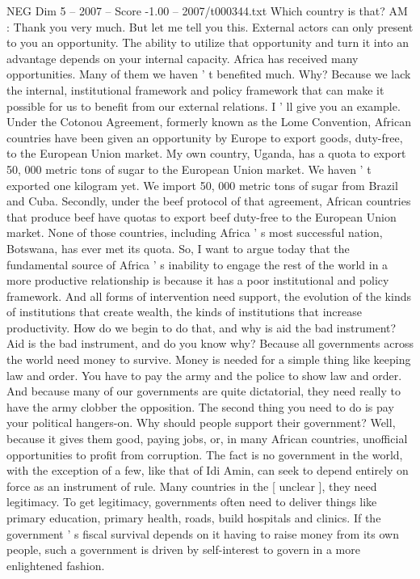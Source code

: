 \begin{textsample}{NEG Dim 5 – 2007 – Score -1.00 – 2007/t000344.txt}
Which country is that?
AM : Thank you very much.
But let me tell you this.
External actors can only present to you an opportunity.
The ability to utilize that opportunity and turn it into an advantage depends on your internal capacity.
Africa has received many opportunities.
Many of them we haven ' t benefited much.
Why?
Because we lack the internal, institutional framework and policy framework that can make it possible for us to benefit from our external relations.
I ' ll give you an example.
Under the Cotonou Agreement, formerly known as the Lome Convention, African countries have been given an opportunity by Europe to export goods, duty-free, to the European Union market.
My own country, Uganda, has a quota to export 50, 000 metric tons of sugar to the European Union market.
We haven ' t exported one kilogram yet.
We import 50, 000 metric tons of sugar from Brazil and Cuba.
Secondly, under the beef protocol of that agreement, African countries that produce beef have quotas to export beef duty-free to the European Union market.
None of those countries, including Africa ' s most successful nation, Botswana, has ever met its quota.
So, I want to argue today that the fundamental source of Africa ' s inability to engage the rest of the world in a more productive relationship is because it has a poor institutional and policy framework.
And all forms of intervention need support, the evolution of the kinds of institutions that create wealth, the kinds of institutions that increase productivity.
How do we begin to do that, and why is aid the bad instrument?
Aid is the bad instrument, and do you know why?
Because all governments across the world need money to survive.
Money is needed for a simple thing like keeping law and order.
You have to pay the army and the police to show law and order.
And because many of our governments are quite dictatorial, they need really to have the army clobber the opposition.
The second thing you need to do is pay your political hangers-on.
Why should people support their government?
Well, because it gives them good, paying jobs, or, in many African countries, unofficial opportunities to profit from corruption.
The fact is no government in the world, with the exception of a few, like that of Idi Amin, can seek to depend entirely on force as an instrument of rule.
Many countries in the [ unclear ], they need legitimacy.
To get legitimacy, governments often need to deliver things like primary education, primary health, roads, build hospitals and clinics.
If the government ' s fiscal survival depends on it having to raise money from its own people, such a government is driven by self-interest to govern in a more enlightened fashion.

\end{textsample}
